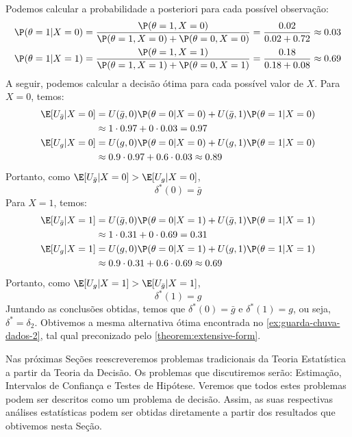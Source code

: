 \begin{example}
 Podemos calcular a probabilidade a posteriori para cada
 possível observação:
 \begin{align*}
  \P(\theta=1|X=0)
  &= \frac{\P(\theta=1,X=0)}
  {\P(\theta=1,X=0) + \P(\theta=0,X=0)}
  = \frac{0.02}{0.02 + 0.72} \approx 0.03 \\
  \P(\theta=1|X=1)
  &= \frac{\P(\theta=1,X=1)}
  {\P(\theta=1,X=1) + \P(\theta=0,X=1)}
  = \frac{0.18}{0.18 + 0.08} \approx 0.69 \\
 \end{align*}
 A seguir, podemos calcular a decisão ótima para
 cada possível valor de $X$. Para $X=0$, temos:
 \begin{align*}
  \E[U_{\bar{g}}|X=0]
  &= U(\bar{g},0)\P(\theta=0|X=0) +
  U(\bar{g},1)\P(\theta=1|X=0) \\
  &\approx 1 \cdot 0.97 + 0 \cdot 0.03 = 0.97 \\
  \E[U_{g}|X=0]
  &= U(g,0)\P(\theta=0|X=0) + U(g,1)\P(\theta=1|X=0) \\
  &\approx 0.9 \cdot 0.97 + 0.6 \cdot 0.03 \approx 0.89\\
 \end{align*}
 Portanto, como $\E[U_{\bar{g}}|X=0] > \E[U_{g}|X=0]$, 
 $$\delta^{*}(0) = \bar{g}$$
 Para $X=1$, temos:
 \begin{align*}
  \E[U_{\bar{g}}|X=1]
  &= U(\bar{g},0)\P(\theta=0|X=1)
  +U(\bar{g},1)\P(\theta=1|X=1) \\
  &\approx 1 \cdot 0.31 + 0 \cdot 0.69 = 0.31 \\
  \E[U_{g}|X=1]
  &= U(g,0)\P(\theta=0|X=1)
  +U(g,1)\P(\theta=1|X=1) \\
  &\approx 0.9 \cdot 0.31 + 0.6 \cdot 0.69
  \approx 0.69 \\				
 \end{align*}
 Portanto, como $\E[U_{g}|X=1] > \E[U_{\bar{g}}|X=1]$, 
 $$\delta^{*}(1) = g$$
 Juntando as conclusões obtidas, 
 temos que $\delta^{*}(0) = \bar{g}$ e
 $\delta^{*}(1) = g$, ou seja,
 $\delta^{*} = \delta_{2}$.
 Obtivemos a mesma alternativa ótima encontrada no
 \cref{ex:guarda-chuva-dados-2},
 tal qual preconizado pelo
 \cref{theorem:extensive-form}.
\end{example}

 Nas próximas Seções reescreveremos 
 problemas tradicionais da Teoria Estatística a partir da
 Teoria da Decisão.
 Os problemas que discutiremos serão:
 Estimação, Intervalos de Confiança e Testes de Hipótese.
 Veremos que todos estes problemas podem ser descritos
 como um problema de decisão.
 Assim, as suas respectivas análises estatísticas
 podem ser obtidas diretamente a partir dos resultados
 que obtivemos nesta Seção.

